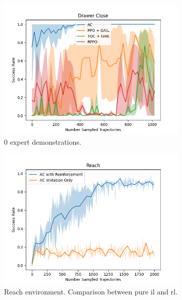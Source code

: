 \begin{figure}[htbp]
\begin{subfigure}[t]{0.32\textwidth}
      \includegraphics[width=\textwidth]{images/0/Drawer Close.png}
      \caption{0 expert demonstrations.}
      \label{fig:drawerclose}
    \end{subfigure}
    \medskip
    \begin{subfigure}[t]{0.45\textwidth}
      \includegraphics[width=\textwidth]{images/1_2000_imi/Reach.png}
      \caption{Reach environment. Comparison between pure \ac{il} and \ac{rl}.}
    \end{subfigure}
    \hfill
    \begin{subfigure}[t]{0.45\textwidth}

\end{subfigure}
\end{figure}
